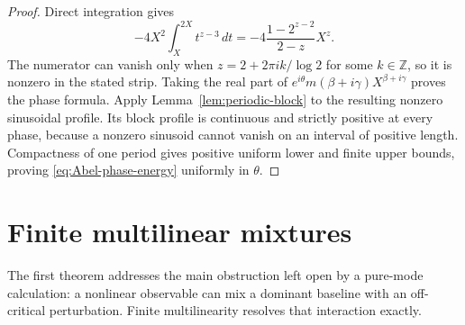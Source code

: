 \documentclass[11pt,a4paper]{amsart}
\theoremstyle{definition}
\begin{document}
\begin{proof}
Direct integration gives
\[
 -4X^2\int_X^{2X}t^{z-3}\,dt
 =-4\frac{1-2^{z-2}}{2-z}X^z.
\]
The numerator can vanish only when
$z=2+2\pi i k/\log2$ for some $k\in\mathbb Z$, so it is nonzero in the stated strip.  Taking the real part of $e^{i\theta}m(\beta+i\gamma)X^{\beta+i\gamma}$ proves the phase formula.  Apply Lemma~\ref{lem:periodic-block} to the resulting nonzero sinusoidal profile.  Its block profile is continuous and strictly positive at every phase, because a nonzero sinusoid cannot vanish on an interval of positive length.  Compactness of one period gives positive uniform lower and finite upper bounds, proving \eqref{eq:Abel-phase-energy} uniformly in $\theta$.
\end{proof}

\section{Finite multilinear mixtures}\label{sec:multilinear}

The first theorem addresses the main obstruction left open by a pure-mode calculation: a nonlinear observable can mix a dominant baseline with an off-critical perturbation.  Finite multilinearity resolves that interaction exactly.
\end{document}
